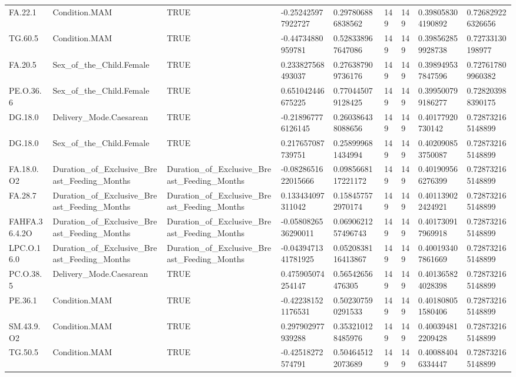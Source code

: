 \begin{longtable}{lllllllll}
FA.22.1 & Condition.MAM & TRUE & -0.252425977922727 & 0.297806886838562 & 149 & 149 & 0.398058304190892 & 0.726829226326656 \\
TG.60.5 & Condition.MAM & TRUE & -0.44734880959781 & 0.528338967647086 & 149 & 149 & 0.398562859928738 & 0.72733130198977 \\
FA.20.5 & Sex\_of\_the\_Child.Female & TRUE & 0.233827568493037 & 0.276387909736176 & 149 & 149 & 0.398949537847596 & 0.727617809960382 \\
PE.O.36.6 & Sex\_of\_the\_Child.Female & TRUE & 0.651042446675225 & 0.770445079128425 & 149 & 149 & 0.399500799186277 & 0.728203988390175 \\
DG.18.0 & Delivery\_Mode.Caesarean & TRUE & -0.218967776126145 & 0.260386438088656 & 149 & 149 & 0.40177920730142 & 0.728732165148899 \\
DG.18.0 & Sex\_of\_the\_Child.Female & TRUE & 0.217657087739751 & 0.258999681434994 & 149 & 149 & 0.402090853750087 & 0.728732165148899 \\
FA.18.0.O2 & Duration\_of\_Exclusive\_Breast\_Feeding\_Months & Duration\_of\_Exclusive\_Breast\_Feeding\_Months & -0.0828651622015666 & 0.0985668117221172 & 149 & 149 & 0.401909566276399 & 0.728732165148899 \\
FA.28.7 & Duration\_of\_Exclusive\_Breast\_Feeding\_Months & Duration\_of\_Exclusive\_Breast\_Feeding\_Months & 0.133434097311042 & 0.158457572970174 & 149 & 149 & 0.401139022424921 & 0.728732165148899 \\
FAHFA.36.4.2O & Duration\_of\_Exclusive\_Breast\_Feeding\_Months & Duration\_of\_Exclusive\_Breast\_Feeding\_Months & -0.0580826536290011 & 0.0690621257496743 & 149 & 149 & 0.401730917969918 & 0.728732165148899 \\
LPC.O.16.0 & Duration\_of\_Exclusive\_Breast\_Feeding\_Months & Duration\_of\_Exclusive\_Breast\_Feeding\_Months & -0.0439471341781925 & 0.0520838116413867 & 149 & 149 & 0.400193407861669 & 0.728732165148899 \\
PC.O.38.5 & Delivery\_Mode.Caesarean & TRUE & 0.475905074254147 & 0.56542656476305 & 149 & 149 & 0.401365824028398 & 0.728732165148899 \\
PE.36.1 & Condition.MAM & TRUE & -0.422381521176531 & 0.502307590291533 & 149 & 149 & 0.401808051580406 & 0.728732165148899 \\
SM.43.9.O2 & Condition.MAM & TRUE & 0.297902977939288 & 0.353210128485976 & 149 & 149 & 0.400394812209428 & 0.728732165148899 \\
TG.50.5 & Condition.MAM & TRUE & -0.42518272574791 & 0.504645122073689 & 149 & 149 & 0.400884046334447 & 0.728732165148899 \\

\end{longtable}

